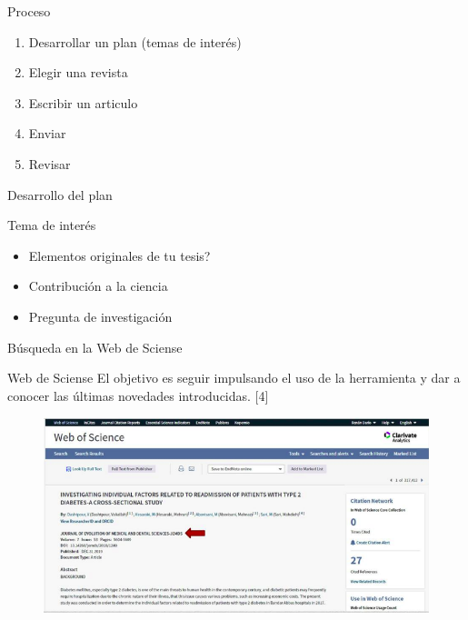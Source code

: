 \begin{frame}{Proceso}
\begin{block}{}
\begin{enumerate}
    \item Desarrollar un plan (temas de interés)
    \item Elegir una revista
    \item Escribir un articulo
    \item Enviar
    \item Revisar
\end{enumerate}
\end{block}   
\end{frame}

\begin{frame}{Desarrollo del plan}
\begin{block}{Tema de interés}
\begin{itemize}
    \item Elementos originales de tu tesis?
    \item Contribución a la ciencia
    \item Pregunta de investigación
\end{itemize}
\end{block}   
\end{frame}

\begin{frame}{Búsqueda en la Web de Sciense}
\begin{block}{Web de Sciense}
El objetivo es seguir impulsando el uso de la herramienta y dar a conocer las últimas novedades introducidas. [4]
\end{block}   
\begin{figure}[H]
    \includegraphics[scale=0.4]{capitulos/webcite.png}
    \label{fig:boat1}
\end{figure}
\end{frame}

